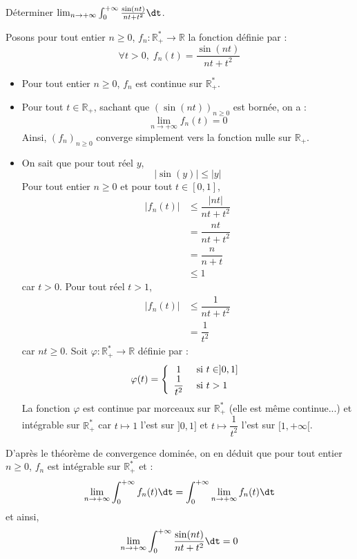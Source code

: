 \documentclass[a4paper,10pt]{report}
\begin{document}
\medskip

\begin{Exa} Déterminer $\lim_{n \to + \infty} \int_{0}^{ + \infty} \frac{\sin(nt)}{nt + t^{2}} \dt$.
\end{Exa}

\corr Posons pour tout entier $n \geq 0$, $f_n : \mathbb{R}_+^* \rightarrow \mathbb{R}$ la fonction définie par :
$$ \forall t >0, \; f_n(t) = \frac{\sin(nt)}{nt + t^{2}}$$
\begin{itemize}
\item Pour tout entier $n \geq 0$, $f_n$ est continue sur $\mathbb{R}_+^*$.
\item Pour tout $t \in \mathbb{R}_+$, sachant que $(\sin(nt))_{n \geq 0}$ est bornée, on a :
$$ \lim_{n \rightarrow + \infty} f_n(t) = 0$$
Ainsi, $(f_n)_{n \geq 0}$ converge simplement vers la fonction nulle sur $\mathbb{R}_+$.
\item On sait que pour tout réel $y$,
$$ \vert \sin(y) \vert \leq \vert y \vert$$
Pour tout entier $n \geq 0$ et pour tout $t \in [0,1]$,
\begin{align*}
\vert f_n(t) \vert & \leq \dfrac{\vert nt \vert }{nt+t^2} \\
& = \dfrac{nt}{nt+t^2} \\
& = \dfrac{n}{n+t} \\
& \leq 1
\end{align*}
car $t >0$. Pour tout réel $t>1$,
\begin{align*}
\vert f_n(t) \vert & \leq \dfrac{1}{nt+t^2} \\
& = \dfrac{1}{t^2} 
\end{align*}
car $nt \geq 0$. Soit $\varphi : \mathbb{R}_+^* \rightarrow \mathbb{R}$ définie par :
$$ \varphi(t) = \left\lbrace \begin{array}{cl}
1 & \hbox{ si } t \in ]0,1] \\
\dfrac{1}{t^2} & \hbox{ si } t>1 \\
\end{array}\right.$$
La fonction $\varphi$ est continue par morceaux sur $\mathbb{R}_+^*$ (elle est même continue...) et intégrable sur $\mathbb{R}_+^*$ car $t \mapsto 1$ l'est sur $]0,1]$ et $t \mapsto \dfrac{1}{t^2}$ l'est sur $[1, + \infty[$. 
\end{itemize}
D'après le théorème de convergence dominée, on en déduit que pour tout entier $n \geq 0$, $f_n$ est intégrable sur $\mathbb{R}_+^*$ et :
$$ \lim_{n \rightarrow + \infty} \int_0^{+ \infty} f_n(t) \dt = \int_0^{+ \infty} \lim_{n \rightarrow + \infty}f_n(t) \dt$$
et ainsi,
$$ \lim_{n \to + \infty} \int_{0}^{ + \infty} \frac{\sin(nt)}{nt + t^{2}} \dt = 0$$
\end{document}
